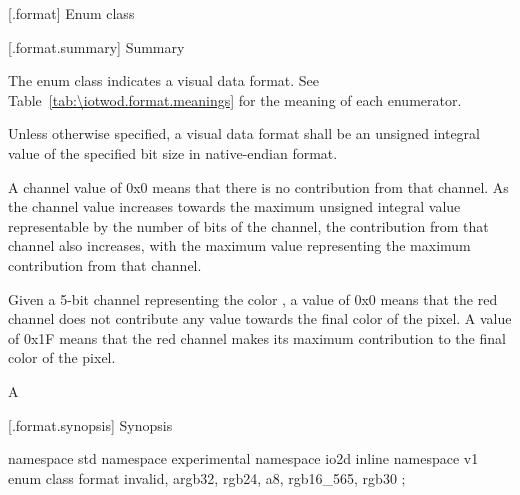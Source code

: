  [\iotwod.format] {Enum class }

 [\iotwod.format.summary] { Summary}

\pnum
The  enum class indicates a visual data format. See Table~\ref{tab:\iotwod.format.meanings} for 
the meaning of each  enumerator.

%
%
\pnum
Unless otherwise specified, a visual data format shall be an unsigned integral
value of the specified bit size in native-endian format.

%
\pnum
A channel value of 0x0 means that there is no contribution from that channel. 
As the channel value increases towards the maximum unsigned integral value 
representable by the number of bits of the channel, the contribution from that 
channel also increases, with the maximum value representing the maximum
contribution from that channel.
\begin{example}
Given a 5-bit channel representing the color , a value of 0x0 means that the red channel does not 
contribute any value towards the final color of the pixel. A value of 0x1F 
means that the red channel makes its maximum contribution to the final color of 
the pixel.

A
\end{example}

 [\iotwod.format.synopsis] { Synopsis}

\begin{codeblock}
namespace std { namespace experimental { namespace io2d { inline namespace v1 {
  enum class format {
    invalid,
    argb32,
    rgb24,
    a8,
    rgb16_565,
    rgb30
  };
} } } }
\end{codeblock}

